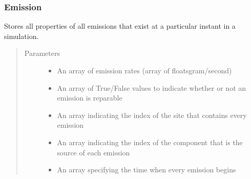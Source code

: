 \documentclass[letterpaper,10pt,english]{sphinxmanual}
\begin{document}
\subsubsection{Emission}
\label{\detokenize{index:emission}}

\begin{fulllineitems}
\label{\detokenize{index:feast.EmissionSimModules.emission_class_functions.Emission}}
Stores all properties of all emissions that exist at a particular instant in a simulation.
\begin{quote}\begin{description}
\item[{Parameters}] \leavevmode\begin{itemize}
\item {} 
 \textendash{} An array of emission rates (array of floats\textendash{}gram/second)

\item {} 
 \textendash{} An array of True/False values to indicate whether or not an emission is reparable

\item {} 
 \textendash{} An array indicating the index of the site that contains every emission

\item {} 
 \textendash{} An array indicating the index of the component that is the source of each emission

\item {} 
 \textendash{} An array specifying the time when every emission begins


\end{itemize}
\end{description}
\end{quote}
\end{fulllineitems}
\end{document}
